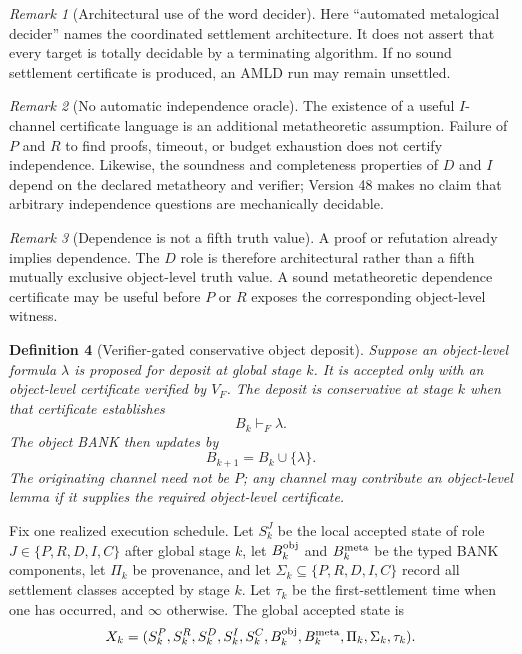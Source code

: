 \documentclass[11pt]{article}
\newtheorem{definition}{Definition}[section]
\theoremstyle{remark}
\newtheorem{remark}[definition]{Remark}
\begin{document}
\begin{remark}[Architectural use of the word decider]
Here ``automated metalogical decider'' names the coordinated settlement architecture. It does not assert that every target is totally decidable by a terminating algorithm. If no sound settlement certificate is produced, an AMLD run may remain unsettled.
\end{remark}

\begin{remark}[No automatic independence oracle]
The existence of a useful $I$-channel certificate language is an additional metatheoretic assumption. Failure of $P$ and $R$ to find proofs, timeout, or budget exhaustion does not certify independence. Likewise, the soundness and completeness properties of $D$ and $I$ depend on the declared metatheory and verifier; Version 48 makes no claim that arbitrary independence questions are mechanically decidable.
\end{remark}

\begin{remark}[Dependence is not a fifth truth value]
A proof or refutation already implies dependence. The $D$ role is therefore architectural rather than a fifth mutually exclusive object-level truth value. A sound metatheoretic dependence certificate may be useful before $P$ or $R$ exposes the corresponding object-level witness.
\end{remark}

\begin{definition}[Verifier-gated conservative object deposit]
Suppose an object-level formula $\lambda$ is proposed for deposit at global stage $k$. It is accepted only with an object-level certificate verified by $V_F$. The deposit is \emph{conservative at stage $k$} when that certificate establishes
\[
B_k\vdash_F\lambda.
\]
The object BANK then updates by
\[
B_{k+1}=B_k\cup\{\lambda\}.
\]
The originating channel need not be $P$; any channel may contribute an object-level lemma if it supplies the required object-level certificate.
\end{definition}

Fix one realized execution schedule. Let $S_k^J$ be the local accepted state of role $J\in\{P,R,D,I,C\}$ after global stage $k$, let $B_k^{\rm obj}$ and $B_k^{\rm meta}$ be the typed BANK components, let $\Pi_k$ be provenance, and let $\Sigma_k\subseteq\{P,R,D,I,C\}$ record all settlement classes accepted by stage $k$. Let $\tau_k$ be the first-settlement time when one has occurred, and $\infty$ otherwise. The global accepted state is
\[
X_k=(S_k^P,S_k^R,S_k^D,S_k^I,S_k^C,B_k^{\rm obj},B_k^{\rm meta},\Pi_k,\Sigma_k,\tau_k).
\]
\end{document}
